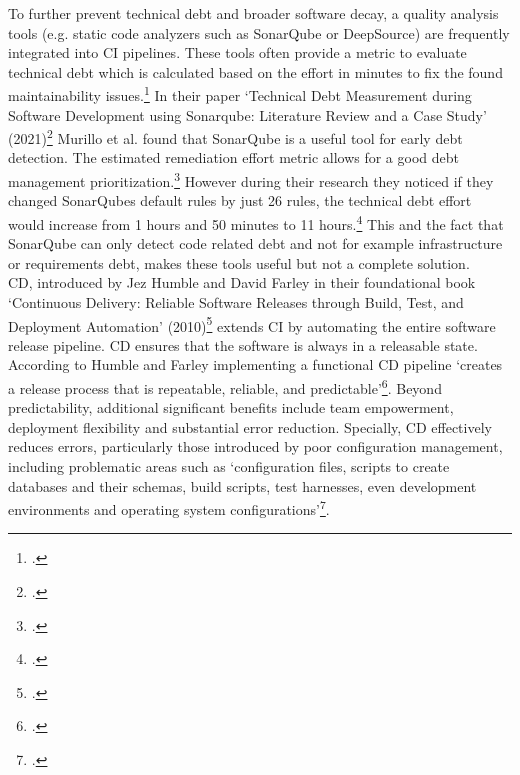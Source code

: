 To further prevent technical debt and broader software decay, a quality analysis tools (e.g. static code analyzers such as SonarQube or DeepSource) are frequently integrated into
\ac{CI} pipelines. These tools often provide a metric to evaluate technical debt which is calculated based on the effort in minutes to fix the found maintainability issues.\footcite{sonarqubeUnderstandingMeasuresMetrics2025}
In their paper `Technical Debt Measurement during Software Development using Sonarqube: Literature Review and a Case Study' (2021)\footcite{murilloTechnicalDebtMeasurement2021}
Murillo et al. found that SonarQube is a useful tool for early debt detection. The estimated remediation effort metric allows for a good debt management prioritization.\footcite[5]{murilloTechnicalDebtMeasurement2021}
However during their research they noticed if they changed SonarQubes default rules by just 26 rules, the technical debt effort would increase from
1 hours and 50 minutes to 11 hours.\footcite[4]{murilloTechnicalDebtMeasurement2021} This and the fact that SonarQube can only detect code related debt and not for example
infrastructure or requirements debt, makes these tools useful but not a complete solution.\\

\ac{CD}, introduced by Jez Humble and David Farley in their foundational book `Continuous Delivery: Reliable Software Releases through Build, Test, and Deployment Automation' (2010)\footcite{humbleContinuousDeliveryReliable2010}
extends \ac{CI} by automating the entire software release pipeline. \ac{CD} ensures that the software is always in a releasable state.
According to Humble and Farley implementing a functional \ac{CD} pipeline `creates a release process that is repeatable, reliable, and predictable'\footcite[17]{humbleContinuousDeliveryReliable2010}.
Beyond predictability, additional significant benefits include team empowerment, deployment flexibility and substantial error reduction.
Specially, \ac{CD} effectively reduces errors, particularly those introduced by poor configuration management, including problematic areas such as
`configuration files, scripts to create databases and their schemas, build scripts, test harnesses, even development environments and operating system configurations'\footcite[19]{humbleContinuousDeliveryReliable2010}.\\

